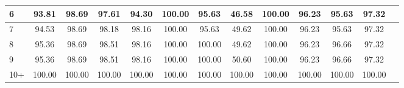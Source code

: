 \begin{tabular}{|l|c|c|c|c|c|c|c|c|c|c|c|c|}
6  & 93.81 & 98.69 & 97.61 & 94.30 & 100.00 & 95.63 & 46.58 & 100.00 & 96.23 & 95.63 & 97.32\\\hline
7  & 94.53 & 98.69 & 98.18 & 98.16 & 100.00 & 95.63 & 49.62 & 100.00 & 96.23 & 95.63 & 97.32\\\hline
8  & 95.36 & 98.69 & 98.51 & 98.16 & 100.00 & 100.00 & 49.62 & 100.00 & 96.23 & 96.66 & 97.32\\\hline
9  & 95.36 & 98.69 & 98.51 & 98.16 & 100.00 & 100.00 & 50.60 & 100.00 & 96.23 & 96.66 & 97.32\\\hline
10+ & 100.00 & 100.00 & 100.00 & 100.00 & 100.00 & 100.00 & 100.00 & 100.00 & 100.00 & 100.00 & 100.00\\\hline\hline
\end{tabular}
